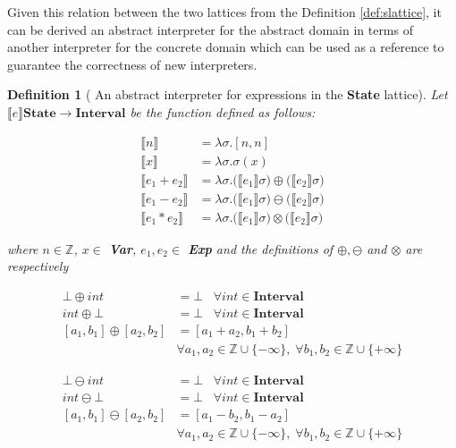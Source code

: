\documentclass{article}
\newtheorem{definition}{Definition}
\begin{document}
Given this relation between the two lattices from the  
Definition \ref{def:slattice}, it can be derived an abstract
interpreter for the abstract domain in terms of another
interpreter for the concrete domain which can be used as
a reference to guarantee the correctness of new interpreters.

\begin{definition}[
  An abstract interpreter for expressions in the \textbf{State}
  lattice
]\label{def:iabs}
  Let $\llbracket e \rrbracket \textbf{State}
  \rightarrow \textbf{Interval}$ be the function 
  defined as follows:

  \begin{align*}
    \llbracket n \rrbracket &= \lambda \sigma. [n, n] \\
    \llbracket x \rrbracket &= \lambda \sigma. \sigma(x) \\
    \llbracket e_1 + e_2 \rrbracket &= 
      \lambda \sigma. 
        \Big(\llbracket e_1\rrbracket\sigma\Big) \oplus
        \Big(\llbracket e_2\rrbracket\sigma\Big) \\
    \llbracket e_1 - e_2 \rrbracket &= 
      \lambda \sigma. 
        \Big(\llbracket e_1\rrbracket\sigma\Big) \ominus
        \Big(\llbracket e_2\rrbracket\sigma\Big) \\
    \llbracket e_1 * e_2 \rrbracket &= 
      \lambda \sigma. 
        \Big(\llbracket e_1\rrbracket\sigma\Big) \otimes
        \Big(\llbracket e_2\rrbracket\sigma\Big)
  \end{align*}

  where $n \in \mathbb{Z}$, $x \in$ \textbf{Var}, $e_1, e_2 \in$ 
  \textbf{Exp} and the definitions of $\oplus, \ominus$ and 
  $\otimes$ are respectively

  \begin{align*}
    \bot \oplus int &= \bot \;\;\;
      \forall int \in \textbf{Interval} \\
    int \oplus \bot &= \bot \;\;\;
      \forall int \in \textbf{Interval} \\
    [a_1, b_1] \oplus [a_2, b_2] &= 
      [a_1 + a_2, b_1 + b_2] \\
        &\forall a_1, a_2 \in \mathbb{Z} \cup \{-\infty\}, 
        \; \forall b_1, b_2 \in \mathbb{Z} \cup \{+\infty\}
  \end{align*}

  \begin{align*}
    \bot \ominus int &= \bot \;\;\;
      \forall int \in \textbf{Interval} \\
    int \ominus \bot &= \bot \;\;\;
      \forall int \in \textbf{Interval} \\
    [a_1, b_1] \ominus [a_2, b_2] &= 
      [a_1 - b_2, b_1 - a_2] \\
        &\forall a_1, a_2 \in \mathbb{Z} \cup \{-\infty\}, 
        \; \forall b_1, b_2 \in \mathbb{Z} \cup \{+\infty\}
  \end{align*}


\end{definition}
\end{document}
